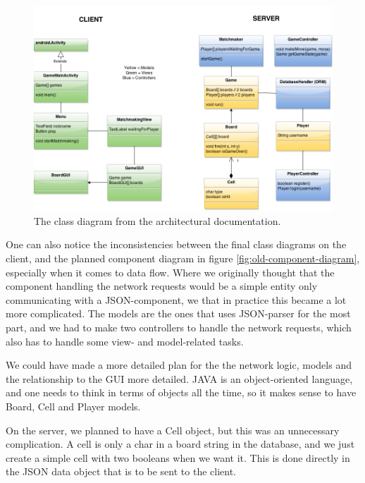 \begin{figure}[H]
    \includegraphics[scale=0.5]{figs/old-class-diagram.png}
    \caption{The class diagram from the architectural documentation. }
    \label{fig:old-class-diagram}
\end{figure}

One can also notice the inconsistencies between the final class diagrams on the client, and the planned component diagram in figure \ref{fig:old-component-diagram}, especially when it comes to data flow. Where we originally thought that the component handling the network requests would be a simple entity only communicating with a JSON-component, we that in practice this became a lot more complicated. The models are the ones that uses JSON-parser for the most part, and we had to make two controllers to handle the network requests, which also has to handle some view- and model-related tasks.

We could have made a more detailed plan for the the network logic, models and the relationship to the GUI more detailed. JAVA is an object-oriented language, and one needs to think in terms of objects all the time, so it makes sense to have Board, Cell and Player models. 

On the server, we planned to have a Cell object, but this was an unnecessary complication. A cell is only a char in a board string in the database, and we just create a simple cell with two booleans when we want it. This is done directly in the JSON data object that is to be sent to the client. 


